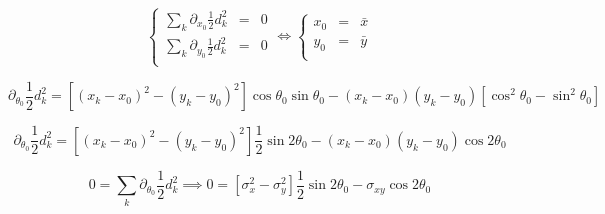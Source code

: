 \documentclass[aps,12pt]{revtex4}
\begin{document}
\begin{equation}
\left\lbrace
\begin{array}{rcl}
\sum_k\partial_{x_0} \frac{1}{2} d^2_k & = & 0\\
\sum_k\partial_{y_0} \frac{1}{2} d^2_k & = & 0\\
\end{array}
\right.
\iff
\left\lbrace
\begin{array}{rcl}
x_0 & = & \bar{x} \\
y_0 & = & \bar{y} \\
\end{array}
\right.
\end{equation}

\begin{equation}
\partial_{\theta_0} \frac{1}{2} d^2_k = \left[ (x_k-x_0)^2-(y_k-y_0)^2 \right] \cos\theta_0\sin\theta_0 - (x_k-x_0) (y_k-y_0) \left[ \cos^2\theta_0 - \sin^2\theta_0\right]
\end{equation}

\begin{equation}
\partial_{\theta_0} \frac{1}{2} d^2_k = \left[ (x_k-x_0)^2 - (y_k-y_0)^2\right] \frac{1}{2} \sin 2\theta_0 - (x_k-x_0) (y_k-y_0) \cos 2\theta_0
\end{equation}

\begin{equation}
0 = \sum_k\partial_{\theta_0} \frac{1}{2} d^2_k \implies 0 = \left[ \sigma_x^2 - \sigma_y^2 \right] \frac{1}{2} \sin 2\theta_0 - \sigma_{xy} \cos 2\theta_0
\end{equation}
\end{document}
